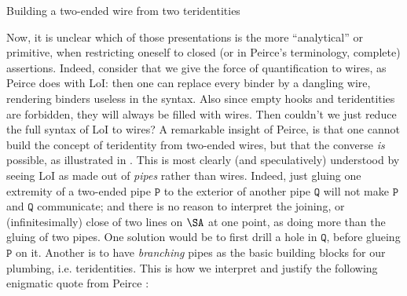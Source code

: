 \begin{scope}
\begin{scope}
\begin{marginfigure}
  \begin{center}
  \end{center}
  \caption{Building a two-ended wire from two teridentities}
\end{marginfigure}

Now, it is unclear which of those presentations is the more ``analytical'' or
primitive, when restricting oneself to closed (or in Peirce's terminology,
complete) assertions. Indeed, consider that we give the force of quantification
to wires, as Peirce does with LoI: then one can replace every binder by a
dangling wire, rendering binders useless in the syntax. Also since empty hooks
and teridentities are forbidden, they will always be filled with wires. Then
couldn't we just reduce the full syntax of LoI to wires? A remarkable insight of
Peirce, is that one cannot build the concept of teridentity from two-ended
wires, but that the converse \emph{is} possible, as illustrated in
. This is most clearly (and speculatively) understood
by seeing LoI as made out of \emph{pipes} rather than wires. Indeed, just gluing
one extremity of a two-ended pipe $\mathtt{P}$ to the exterior of another pipe
$\mathtt{Q}$ will not make $\mathtt{P}$ and $\mathtt{Q}$ communicate; and there
is no reason to interpret the joining, or (infinitesimally) close 
of two lines on $\SA$ at one point, as doing more than the gluing of two
pipes. One
solution would be to first drill a hole in $\mathtt{Q}$, before glueing
$\mathtt{P}$ on it. Another is to have \emph{branching} pipes as the basic
building blocks for our plumbing, i.e. teridentities. This is how we interpret
and justify  the following enigmatic quote from Peirce
\cite[p.~116]{Roberts+1973}:


\end{scope}
\end{scope}
